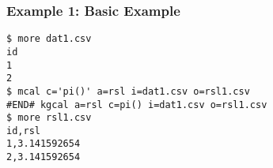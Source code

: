 \subsubsection*{Example 1: Basic Example}



\begin{Verbatim}[baselinestretch=0.7,frame=single]
$ more dat1.csv
id
1
2
$ mcal c='pi()' a=rsl i=dat1.csv o=rsl1.csv
#END# kgcal a=rsl c=pi() i=dat1.csv o=rsl1.csv
$ more rsl1.csv
id,rsl
1,3.141592654
2,3.141592654
\end{Verbatim}
